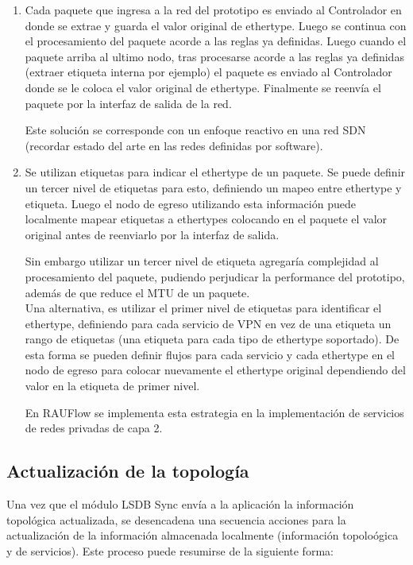 \begin{enumerate}
\item Cada paquete que ingresa a la red del prototipo es enviado al Controlador en donde se extrae y guarda el valor original de ethertype. Luego se continua con el procesamiento del paquete acorde a las reglas ya definidas. Luego cuando el paquete arriba al ultimo nodo, tras procesarse acorde a las reglas ya definidas (extraer etiqueta interna por ejemplo) el paquete es enviado al Controlador donde se le coloca el valor original de ethertype. Finalmente se reenv\'ia el paquete por la interfaz de salida de la red.

Este soluci\'on se corresponde con un enfoque reactivo en una red SDN (recordar estado del arte en las redes definidas por software).

\item Se utilizan etiquetas para indicar el ethertype de un paquete. Se puede definir un tercer nivel de etiquetas para esto, definiendo un mapeo entre ethertype y etiqueta. Luego el nodo de egreso utilizando esta informaci\'on puede localmente mapear etiquetas a ethertypes colocando en el paquete el valor original antes de reenviarlo por la interfaz de salida. 

Sin embargo utilizar un tercer nivel de etiqueta agregar\'ia complejidad al procesamiento del paquete, pudiendo perjudicar la performance del prototipo, adem\'as de que reduce el MTU de un paquete.\\ 

Una alternativa, es utilizar el primer nivel de etiquetas para identificar el ethertype, definiendo para cada servicio de VPN en vez de una etiqueta un rango de etiquetas (una etiqueta para cada tipo de ethertype soportado). De esta forma se pueden definir flujos para cada servicio y cada ethertype en el nodo de egreso para colocar nuevamente el ethertype original dependiendo del valor en la etiqueta de primer nivel.

En RAUFlow se implementa esta estrategia en la implementaci\'on de servicios de redes privadas de capa 2. 

\end{enumerate} 

\subsection{Actualizaci\'on de la topolog\'ia}
Una vez que el m\'odulo LSDB Sync envía a la aplicaci\'on la informaci\'on topol\'ogica actualizada, se desencadena una secuencia acciones para la actualizaci\'on de la informaci\'on almacenada localmente 
 (informaci\'on topolo\'ogica y de servicios). Este proceso puede resumirse de la siguiente forma:

